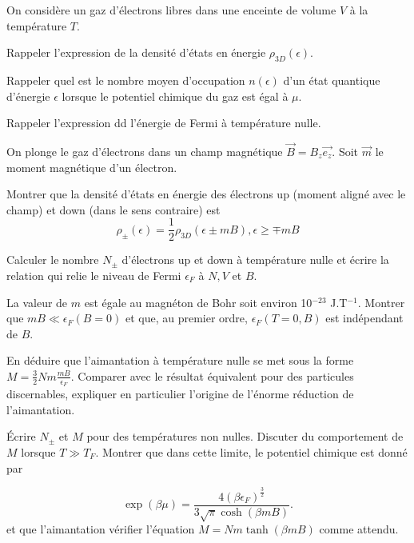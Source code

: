 On considère un gaz d'électrons libres dans une enceinte de volume $V$ à la température $T$.

\question
Rappeler l'expression de la densité d'états en énergie $\rho_{3D}(\epsilon)$.

\question
Rappeler quel est le nombre moyen d'occupation $n(\epsilon)$ d'un état quantique d'énergie $\epsilon$ lorsque le potentiel chimique du gaz est égal à $\mu$.

\question
Rappeler l'expression dd l'énergie de Fermi à température nulle.

\medskip

On plonge le gaz d'électrons dans un champ magnétique $\vec{B}=B_z\vec{e_z}$. Soit $\vec{m}$ le moment magnétique d'un électron.

\question
Montrer que la densité d'états en énergie des électrons up (moment aligné avec le champ) et down (dans le sens contraire) est
$$
\rho_\pm(\epsilon)=\frac{1}{2}\rho_{3D}(\epsilon \pm mB), \epsilon \geq \mp mB
$$

\question
Calculer le nombre $N_\pm$ d'électrons up et down à température nulle et écrire la relation qui relie le niveau de Fermi $\epsilon_F$ à $N, V$ et $B$.

\question
La valeur de $m$ est égale au  magnéton de Bohr soit environ 10$^{-23}$ J.T$^{-1}$. Montrer que $mB \ll \epsilon_F(B=0)$ et que, au premier ordre, $\epsilon_F(T=0,B)$ est indépendant de $B$.

\question
En déduire que l'aimantation à température nulle se met sous la forme $M=\frac{3}{2} N m \frac{mB}{\epsilon_F}$. Comparer avec le résultat équivalent pour des particules discernables, expliquer en particulier l'origine de l'énorme réduction de l'aimantation.

\question
\'Ecrire $N_\pm$ et $M$ pour des températures non nulles. Discuter du comportement de $M$ lorsque $T\gg T_F$. Montrer que dans cette limite, le potentiel chimique est donné par

$$
\exp (\beta \mu)=\frac{4(\beta \epsilon_F)^{\frac{3}{2}}}{3\sqrt{\pi}\cosh(\beta m B)}. \nonumber
$$
et que l'aimantation vérifier l'équation $M= Nm\tanh(\beta m B)$ comme attendu.

